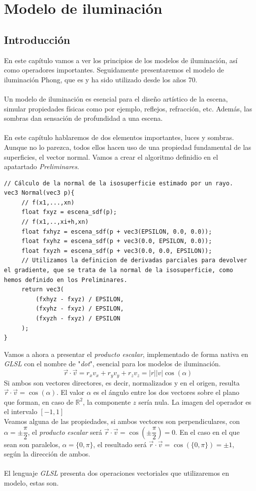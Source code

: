 \chapter{Modelo de iluminación}
\section{Introducción}
En este capítulo vamos a ver los principios de los modelos de iluminación, así como operadores importantes. Seguidamente presentaremos el modelo de iluminación Phong, que es y ha sido utilizado desde los años 70.\\\\Un modelo de iluminación es esencial para el diseño artístico de la escena, simular propiedades físicas como por ejemplo, reflejos, refracción, etc. Además, las sombras dan sensación de profundidad a una escena.\\\\
En este capítulo hablaremos de dos elementos importantes, luces y sombras. Aunque no lo parezca, todos ellos hacen uso de una propiedad fundamental de las superficies, el vector normal. Vamos a crear el algoritmo definidio en el apatartado \textit{Preliminares}.
\begin{lstlisting}
// Cálculo de la normal de la isosuperficie estimado por un rayo.
vec3 Normal(vec3 p){
     // f(x1,...,xn)
     float fxyz = escena_sdf(p);
     // f(x1,..,xi+h,xn)
     float fxhyz = escena_sdf(p + vec3(EPSILON, 0.0, 0.0));
     float fxyhz = escena_sdf(p + vec3(0.0, EPSILON, 0.0));
     float fxyzh = escena_sdf(p + vec3(0.0, 0.0, EPSILON));
     // Utilizamos la definicion de derivadas parciales para devolver el gradiente, que se trata de la normal de la isosuperficie, como hemos definido en los Preliminares.
     return vec3(
         (fxhyz - fxyz) / EPSILON,
         (fxyhz - fxyz) / EPSILON,
         (fxyzh - fxyz) / EPSILON
     );
}
\end{lstlisting}
\newpage
Vamos a ahora a presentar el \textit{producto escalar}, implementado de forma nativa en \textit{GLSL} con el nombre de "\textit{dot}", esencial para los modelos de iluminación.
\[\Vec{r} \cdot  \Vec{v} = r_xv_x + r_yv_y + r_zv_z = \vert r\vert\vert v\vert\cos(\alpha)\]
Si ambos son vectores directores, es decir, normalizados y en el origen, resulta \(\Vec{r} \cdot \Vec{v} = \cos(\alpha)\). El valor \(\alpha\) es el ángulo entre los dos vectores sobre el plano que forman, en caso de \(\mathbb{R}^2\), la componente \(z\) sería nula. La imagen del operador es el intervalo \([-1,1]\)\\Veamos alguna de las propiedades, si ambos vectores son perpendiculares, con \(\alpha=\pm\dfrac{\pi}{2}\), el \textit{producto escalar} será \(\Vec{r}\cdot\Vec{v}=\cos\left(\pm\dfrac{\pi}{2}\right)=0\). En el caso en el que sean son paralelos, \(\alpha=\{0,\pi\}\), el resultado será  \(\Vec{r}\cdot\Vec{v}=\cos(\{0, \pi\})=\pm 1\), según la dirección de ambos.\\\\ El lenguaje \textit{GLSL} presenta dos operaciones vectoriales que utilizaremos en modelo, estas son.
